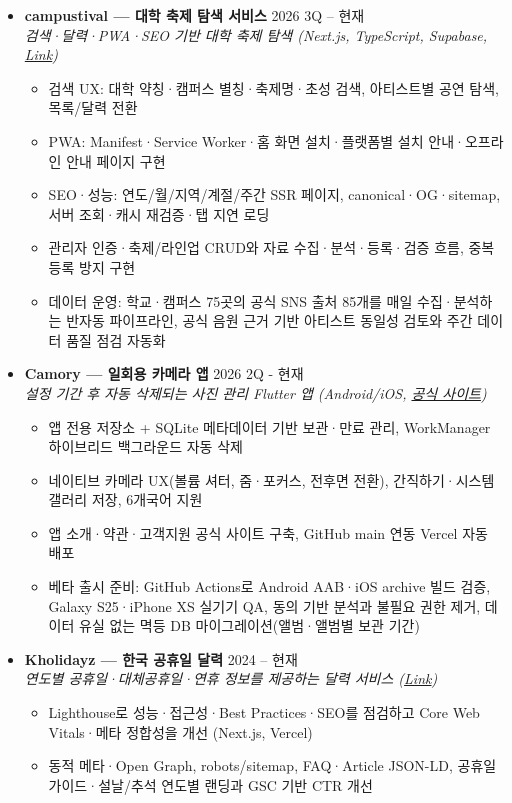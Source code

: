 \documentclass[a4paper, 11pt]{article}
\begin{document}
{\begin{itemize}[leftmargin=*, itemsep=5pt]
        \item \textbf{campustival — 대학 축제 탐색 서비스} \hfill 2026 3Q -- 현재 \\
        \textit{검색·달력·PWA·SEO 기반 대학 축제 탐색 (Next.js, TypeScript, Supabase, \href{https://campustival.com}{Link})}
        \begin{itemize}[label={-}, noitemsep, topsep=2pt]
            \item 검색 UX: 대학 약칭·캠퍼스 별칭·축제명·초성 검색, 아티스트별 공연 탐색, 목록/달력 전환
            \item PWA: Manifest·Service Worker·홈 화면 설치·플랫폼별 설치 안내·오프라인 안내 페이지 구현
            \item SEO·성능: 연도/월/지역/계절/주간 SSR 페이지, canonical·OG·sitemap, 서버 조회·캐시 재검증·탭 지연 로딩
            \item 관리자 인증·축제/라인업 CRUD와 자료 수집·분석·등록·검증 흐름, 중복 등록 방지 구현
            \item 데이터 운영: 학교·캠퍼스 75곳의 공식 SNS 출처 85개를 매일 수집·분석하는 반자동 파이프라인, 공식 음원 근거 기반 아티스트 동일성 검토와 주간 데이터 품질 점검 자동화
        \end{itemize}

        \item \textbf{Camory — 일회용 카메라 앱} \hfill 2026 2Q - 현재 \\
        \textit{설정 기간 후 자동 삭제되는 사진 관리 Flutter 앱 (Android/iOS, \href{https://camory.vercel.app}{공식 사이트})}
        \begin{itemize}[label={-}, noitemsep, topsep=2pt]
            \item 앱 전용 저장소 + SQLite 메타데이터 기반 보관·만료 관리, WorkManager 하이브리드 백그라운드 자동 삭제
            \item 네이티브 카메라 UX(볼륨 셔터, 줌·포커스, 전후면 전환), 간직하기·시스템 갤러리 저장, 6개국어 지원
            \item 앱 소개·약관·고객지원 공식 사이트 구축, GitHub main 연동 Vercel 자동 배포
            \item 베타 출시 준비: GitHub Actions로 Android AAB·iOS archive 빌드 검증, Galaxy S25·iPhone XS 실기기 QA, 동의 기반 분석과 불필요 권한 제거, 데이터 유실 없는 멱등 DB 마이그레이션(앨범·앨범별 보관 기간)
        \end{itemize}

        \item \textbf{Kholidayz — 한국 공휴일 달력} \hfill 2024 -- 현재 \\
        \textit{연도별 공휴일·대체공휴일·연휴 정보를 제공하는 달력 서비스 (\href{https://www.kholidayz.com}{Link})}
        \begin{itemize}[label={-}, noitemsep, topsep=2pt]
            \item Lighthouse로 성능·접근성·Best Practices·SEO를 점검하고 Core Web Vitals·메타 정합성을 개선 (Next.js, Vercel)
            \item 동적 메타·Open Graph, robots/sitemap, FAQ·Article JSON-LD, 공휴일 가이드·설날/추석 연도별 랜딩과 GSC 기반 CTR 개선
        \end{itemize}


\end{itemize}}
\end{document}
